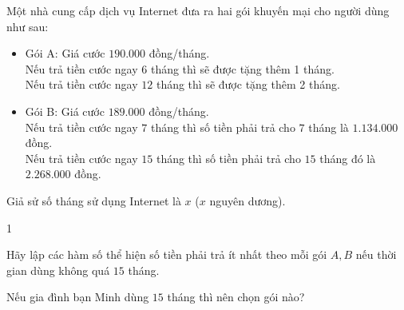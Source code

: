 \begin{bt}%
	Một nhà cung cấp dịch vụ Internet đưa ra hai gói khuyến mại cho người dùng như sau:
	\begin{itemize}
		\item Gói A: Giá cước $190.000$ đồng/tháng.\\
		Nếu trả tiền cước ngay $6$ tháng thì sẽ được tặng thêm 1 tháng.\\
		Nếu trả tiền cước ngay $12$ tháng thì sẽ được tặng thêm 2 tháng.
		\item Gói B: Giá cước $189.000$ đồng/tháng.\\
		Nếu trả tiền cước ngay $7$ tháng thì số tiền phải trả cho $7$ tháng là $1.134.000$ đồng.\\
		Nếu trả tiền cước ngay $15$ tháng thì số tiền phải trả cho $15$ tháng đó là $2.268.000$ đồng.
	\end{itemize}
	Giả sử số tháng sử dụng Internet là $x$ ($x$ nguyên dương).
	\begin{enumEX}[a)]{1}
		\item Hãy lập các hàm số thể hiện số tiền phải trả ít nhất theo mỗi gói $A, B$ nếu thời gian dùng không quá $15$ tháng.
		\item Nếu gia đình bạn Minh dùng $15$ tháng thì nên chọn gói nào?
	\end{enumEX}
\end{bt}

